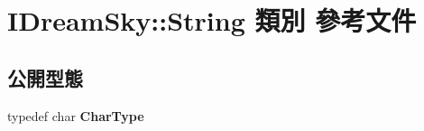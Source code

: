 \hypertarget{class_i_dream_sky_1_1_string}{}\section{I\+Dream\+Sky\+:\+:String 類別 參考文件}
\label{class_i_dream_sky_1_1_string}
\subsection*{公開型態}
\begin{DoxyCompactItemize}
\item 
typedef char {\bfseries Char\+Type}\hypertarget{class_i_dream_sky_1_1_string_a65a693dc57e3038c9b79681a1aef457d}{}\label{class_i_dream_sky_1_1_string_a65a693dc57e3038c9b79681a1aef457d}

\end{DoxyCompactItemize}

